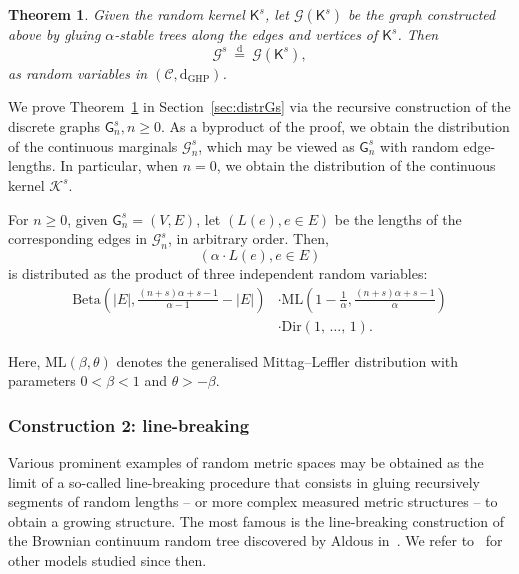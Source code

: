 \documentclass[10pt]{amsart}
\newtheorem{theo}{Theorem}[section]
\theoremstyle{definition}\newtheorem{defi}[theo]{Definition}\newtheorem{rema}[theo]{Remark}\newtheorem{exam}[theo]{Example}\newtheorem{exem}[theo]{Example}\newtheorem{nota}[theo]{Notation}
\newcommand{\Betal}{\mathrm{Beta}}
\newcommand{\ML}{\mathrm{ML}}
\newcommand{\GHP}{\mathrm{GHP}}
\newcommand{\rmd}{\mathrm{d}}
\newcommand{\Dir}{\mathrm{Dir}}
\newcommand{\cG}{\mathcal{G}}
\newcommand{\cK}{\mathcal{K}}
\newcommand{\sG}{\mathsf{G}}
\newcommand{\sK}{\mathsf{K}}
\newcommand{\scrC}{\mathscr{C}}
\begin{document}

\begin{theo}\label{thm:distrGs}
Given the random kernel $\sK^s$, let $\cG(\sK^s)$ be the graph constructed above by gluing $\alpha$-stable trees along the edges and vertices of $\sK^s$. Then
\[
\cG^s \ \overset{\rmd}= \ \cG(\sK^s),
\]
as random variables in $(\scrC,\rmd_{\GHP})$.
\end{theo}

We prove Theorem~\ref{thm:distrGs} in Section~\ref{sec:distrGs} via the recursive construction of the discrete graphs $\sG_n^s,n \geq 0$. As a byproduct of the proof, we obtain the distribution of the continuous marginals $\cG_n^s$, which may be viewed as $\sG_n^s$ with random edge-lengths. In particular, when $n=0$, we obtain the distribution of the continuous kernel $\cK^s$.

\begin{prop}\label{cor:lengthskernel}
For $n \geq 0$, given $\sG_n^s=(V,E)$, let $(L(e), e \in E)$ be the lengths of the corresponding edges in $\cG_n^s$, in arbitrary order. Then,
\[
\left(\alpha \cdot L(e), e \in E \right)
\]
is distributed as the product of three independent random variables:
\begin{equation}\label{ref:BMLD}
\begin{split}
\Betal\left(|E|,\frac{(n+s)\alpha+s-1}{\alpha-1}-|E|\right) &\cdot \ML\left(1-\frac{1}{\alpha}, \frac{(n+s)\alpha+s-1}{\alpha} \right)\\
 &\cdot \Dir(1,\,\ldots,\,1).
\end{split}
\end{equation}
\end{prop}

Here, $\ML(\beta,\theta)$ denotes the generalised Mittag--Leffler distribution with parameters $0 < \beta < 1$ and $\theta > -\beta$.

\subsubsection{Construction 2: line-breaking}\label{cons2:LB}

Various prominent examples of random metric spaces may be obtained as the limit of a so-called line-breaking procedure that consists in gluing recursively segments of random lengths -- or more complex measured metric structures -- to obtain a growing structure. The most famous is the line-breaking construction of the Brownian continuum random tree discovered by Aldous in~\cite{AldousCRT1}. We refer to~\cite{ABBrGo, CH14, GHlinebreaking, RW16, Sen17, Sen19+_scaling} for other models studied since then.
\end{document}
